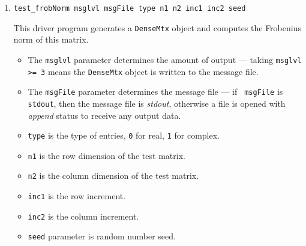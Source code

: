 \begin{enumerate}
\item
\begin{verbatim}
test_frobNorm msglvl msgFile type n1 n2 inc1 inc2 seed
\end{verbatim}
This driver program generates a {\tt DenseMtx} object and
computes the Frobenius norm of this matrix.
\par
\begin{itemize}
\item
The {\tt msglvl} parameter determines the amount of output ---
taking {\tt msglvl >= 3} means the {\tt DenseMtx} object is written
to the message file.
\item
The {\tt msgFile} parameter determines the message file --- if {\tt
msgFile} is {\tt stdout}, then the message file is {\it stdout},
otherwise a file is opened with {\it append} status to receive any
output data.
\item
{\tt type} is the type of entries, {\tt 0} for real, {\tt 1} for complex.
\item
{\tt n1} is the row dimension of the test matrix.
\item
{\tt n2} is the column dimension of the test matrix.
\item
{\tt inc1} is the row increment.
\item
{\tt inc2} is the column increment.
\item
{\tt seed} parameter is random number seed.
\end{itemize}


\end{enumerate}
